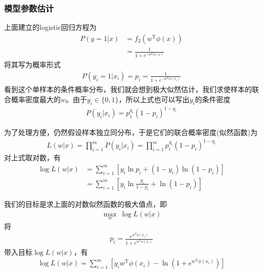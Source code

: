         \subsubsection{模型参数估计}
            \par
            上面建立的logistic回归方程为
            \begin{align*}
            P(y=1|x) &= f_2(w^\mathrm{T}\phi(x))\\
            &= \frac{1}{1+e^{-w^\mathrm{T}\phi(x)}}
            \end{align*}
            将其写为概率形式
            \begin{align*}
            P(y_i=1|x_i) = p_i
            = \frac{1}{1+e^{-w^\mathrm{T}\phi(x_i)}}
            \end{align*}
            看到这个单样本的条件概率分布，我们就会想到极大似然估计，我们求使样本的联合概率密度最大的$w$。由于$y_i\in \{0,1\}$，所以上式也可以写出$y_i$的条件密度
            \begin{align*}
            P(y_i|x_i) = p_1^{y_i}(1-p_i)^{1-y_i}
            \end{align*}
            \par
            为了处理方便，仍然假设样本独立同分布，于是它们的联合概率密度(似然函数)为
            \begin{align*}
            L(w|x) = \prod_{i=1}^mP(y_i|x_i) = \prod_{i=1}^mp_i^{y_i}(1-p_i)^{1-y_i}
            \end{align*}
            对上式取对数，有
            \begin{align*}
            \log L(w|x) &= \sum_{i=1}^m[y_i\ln p_i + (1-y_i)\ln (1-p_i)]\\
            &=\sum_{i=1}^m\left[ y_i\ln \frac{p_i}{1-p_i} + \ln(1-p_i) \right]
            \end{align*}
            \par
            我们的目标是求上面的对数似然函数的极大值点，即
            \begin{align*}
            \max_w\ \log L(w|x)
            \end{align*}
            将
            \begin{align*}
            p_i = \frac{e^{w^\mathrm{T}\phi(x_i)}}{1+e^{w^\mathrm{T}\phi(x_i)}}
            \end{align*}
            带入目标$\log L(w|x)$，有
            \begin{align*}
            \log L(w|x) = \sum_{i=1}^m\left[ y_iw^\mathrm{T}\phi(x_i) - \ln \left( 1+e^{w^\mathrm{T}\phi(x_i)} \right)   \right]
            \end{align*}
